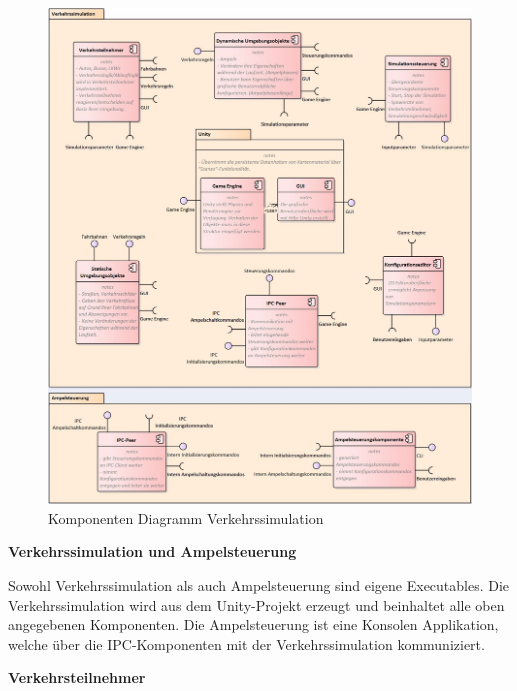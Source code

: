 \begin{figure}[H]
\begin{center}
	\includegraphics[scale=0.673]{BilderAllgemein/Komponentdiagram.JPG}
\end{center}
	\caption{Komponenten Diagramm Verkehrssimulation}
\end{figure}

\begin{flushleft}
\textbf{Verkehrssimulation und Ampelsteuerung}
\end{flushleft}
\vspace{-0.3 cm}

Sowohl Verkehrssimulation als auch Ampelsteuerung sind eigene Executables. Die Verkehrssimulation wird aus dem Unity-Projekt erzeugt und beinhaltet alle oben angegebenen Komponenten. Die Ampelsteuerung ist eine Konsolen Applikation, welche über die IPC-Komponenten mit der Verkehrssimulation kommuniziert.

\begin{flushleft}
\textbf{Verkehrsteilnehmer}
\end{flushleft}
\vspace{-0.3 cm}

